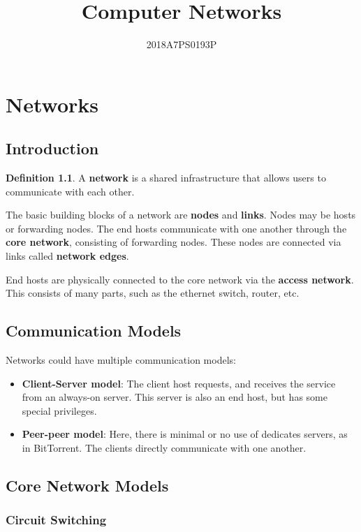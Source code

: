 \documentclass[12pt,letterpaper]{amsbook}
\title{Computer Networks}
\author{2018A7PS0193P}
\theoremstyle{definition}
\newtheorem{definition}{Definition}[section] %
\begin{document}
\maketitle

\chapter{Networks}

\section{Introduction}

\begin{definition}
  A \textbf{network} is a shared infrastructure that allows users to communicate with each other.
\end{definition}

The basic building blocks of a network are \textbf{nodes} and \textbf{links}. Nodes may be hosts or forwarding nodes. The end hosts communicate with one another through the \textbf{core network}, consisting of forwarding nodes. These nodes are connected via links called \textbf{network edges}.

End hosts are physically connected to the core network via the \textbf{access network}. This consists of many parts, such as the ethernet switch, router, etc.

\section{Communication Models}

Networks could have multiple communication models:

\begin{itemize}
  \item \textbf{Client-Server model}: The client host requests, and receives the service from an always-on server. This server is also an end host, but has some special privileges.
  \item \textbf{Peer-peer model}: Here, there is minimal or no use of dedicates servers, as in BitTorrent. The clients directly communicate with one another.
\end{itemize}

\section{Core Network Models}

\subsection{Circuit Switching}
\end{document}
